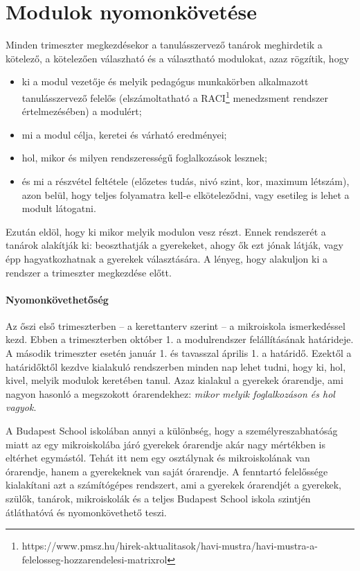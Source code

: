 \section{Modulok nyomonkövetése}
Minden trimeszter megkezdésekor a tanulásszervező tanárok meghirdetik a kötelező, a kötelezően válaszható és a választható modulokat, azaz rögzítik, hogy
\begin{itemize}
    \item ki a modul vezetője és melyik pedagógus munkakörben alkalmazott tanulásszervező felelős (elszámoltatható a RACI\footnote{https://www.pmsz.hu/hirek-aktualitasok/havi-mustra/havi-mustra-a-felelosseg-hozzarendelesi-matrixrol} menedzsment rendszer értelmezésében) a modulért;
    \item mi a modul célja, keretei és várható eredményei;
    \item hol, mikor és milyen rendszerességű foglalkozások lesznek;
    \item és mi a részvétel feltétele (előzetes tudás, nivó szint, kor, maximum létszám), azon belül, hogy teljes folyamatra kell-e elköteleződni, vagy esetileg is lehet a modult látogatni.
\end{itemize}
Ezután eldöl, hogy ki mikor  melyik modulon vesz részt. Ennek rendszerét a tanárok alakítják ki: beoszthatják a gyerekeket, ahogy ők ezt jónak látják, vagy épp hagyatkozhatnak a gyerekek választására. A lényeg, hogy alakuljon ki a rendszer a trimeszter megkezdése előtt.

\paragraph{Nyomonkövethetőség}
Az őszi első trimeszterben  -- a kerettanterv szerint -- a mikroiskola ismerkedéssel kezd. Ebben a trimeszterben október 1. a modulrendszer felállításának határideje. A második trimeszter esetén január 1. és tavasszal április 1. a határidő. Ezektől a határidőktől kezdve kialakuló rendszerben minden nap lehet tudni, hogy ki, hol, kivel, melyik modulok keretében tanul. Azaz kialakul a gyerekek órarendje, ami nagyon hasonló a megszokott órarendekhez: \emph{mikor melyik foglalkozáson és hol vagyok}.

A Budapest School iskolában annyi a különbség, hogy a személyreszabhatóság miatt az egy mikroiskolába járó gyerekek órarendje akár nagy mértékben is eltérhet egymástól. Tehát itt nem egy osztálynak és mikroiskolának van órarendje, hanem a gyerekeknek van saját órarendje. A fenntartó felelőssége kialakítani azt a számítógépes rendszert, ami a gyerekek órarendjét a gyerekek, szülők, tanárok, mikroiskolák és a teljes Budapest School iskola szintjén átláthatóvá és nyomonkövethető teszi.

